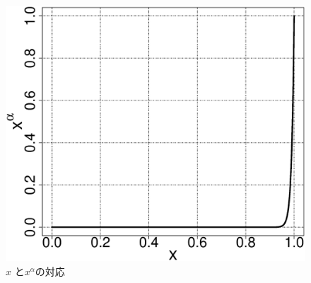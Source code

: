 \documentclass[../main/main]{subfiles}
\begin{document}
\begin{figure}[htbp]
\begin{center}
\centering
\includegraphics[width=0.4\linewidth]{../figures/dtlz4_position_sensitive.eps}
\end{center}
\setlength{\abovecaptionskip}{-8mm}
\setlength{\belowcaptionskip}{0mm}
\caption{$x$ と$x^ \alpha$の対応}
\label{dtlz4_x}
\end{figure}

%
%
\newpage
\end{document}
